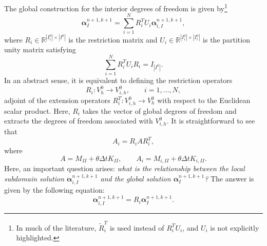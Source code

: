 \documentclass[a4paper, 11pt]{article}
\theoremstyle{remark}
\begin{document}
The global construction for the interior degrees of freedom is given by\footnote{In much of the literature, $\tilde{R}_i^{T}$ is used instead of $R_i^T U_i$, and $U_i$ is not explicitly highlighted.}
\begin{equation*}
    \boldsymbol{\alpha}_{I}^{n+1, k+1} = \sum_{i=1}^{N}R_{i}^{T}U_{i}\boldsymbol{\alpha}_{i, I}^{n+1, k+1},
\end{equation*}
where $R_{i}\in\mathbb{R}^{|I^{0}_{i}|\times |I^{0}|}$ is the restriction matrix and $U_{i}\in\mathbb{R}^{|I^{0}_{i}|\times |I^{0}_{i}|}$ is the partition unity matrix satisfying
\begin{equation*}
    \sum_{i=1}^{N}R_{i}^{T}U_{i}R_{i} = I_{|I^{0}|}.
\end{equation*}
In an abstract sense, it is equivalent to defining the restriction operators
\begin{equation*}
    R_{i}: V_{h}^{0} \to V_{i, h}^{0}, \qquad i = 1, \ldots, N,
\end{equation*}
adjoint of the extension operators $R_{i}^{T}: V_{i, h}^{0} \to V_{h}^{0}$ with respect to the Euclidean scalar product. Here, $R_{i}$ takes the vector of global degrees of freedom and extracts the degrees of freedom associated with $V_{i, h}^{0}$. It is straightforward to see that
\begin{equation*}
    A_{i} = R_{i}AR_{i}^{T},
\end{equation*}
where
\begin{equation*}
    A = M_{II} + \theta\Delta t K_{II}, \qquad
    A_{i} =  M_{i, II} + \theta\Delta t K_{i, II}.
\end{equation*}
Here, an important question arises: \textit{what is the relationship between the local subdomain solution $\boldsymbol{\alpha}_{i, I}^{n+1, k+1}$ 
and the global solution $\boldsymbol{\alpha}_{I}^{n+1, k+1}$?} The answer is given by the following equation:
\begin{equation*}
    \boldsymbol{\alpha}_{i, I}^{n+1, k+1} = R_{i}\boldsymbol{\alpha}_{I}^{n+1, k+1}.
\end{equation*}
\end{document}
